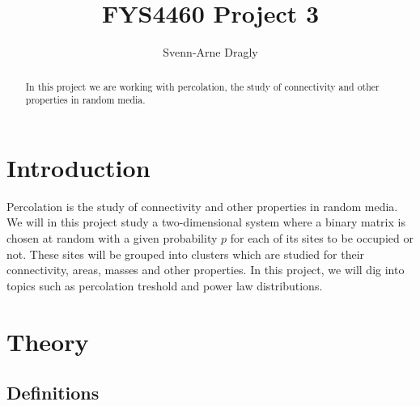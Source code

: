 \documentclass[a4paper,reprint,floatfix,amsmath,amssymb,aps,pra]{revtex4-1}
\begin{document}
\title{FYS4460 Project 3}
\author{Svenn-Arne Dragly}

\begin{abstract}
In this project we are working with percolation, the study of connectivity and other properties in random media.
\end{abstract}

\maketitle

\section{Introduction}

Percolation is the study of connectivity and other properties in random media. We will in this project study a two-dimensional system where a binary matrix is chosen at random with a given probability $p$ for each of its sites to be occupied or not. These sites will be grouped into clusters which are studied for their connectivity, areas, masses and other properties. In this project, we will dig into topics such as percolation treshold and power law distributions.

\section{Theory}

\subsection{Definitions}
\end{document}
